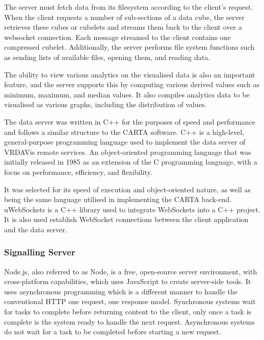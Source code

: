 The server must fetch data from its filesystem according to the client's request. 
When the client requests a number of sub-sections of a data cube, the server retrieves these cubes or cubelets and streams them back to the client over a websocket connection. 
Each message streamed to the client contains one compressed cubelet. 
Additionally, the server performs file system functions such as sending lists of available files, opening them, and reading data.

The ability to view various analytics on the visualised data is also an important feature, and the server supports this by computing various derived values such as minimum, maximum, and median values. 
It also compiles analytics data to be visualised as various graphs, including the distribution of values.

The data server was written in C++ for the purposes of speed and performance and follows a similar structure to the CARTA software.
C++ is a high-level, general-purpose programming language used to implement the data server of VRDAVis remote services. 
An object-oriented programming language that was initially released in 1985 as an extension of the C programming language, with a focus on performance, efficiency, and flexibility.

It was selected for its speed of execution and object-oriented nature, as well as being the same language utilised in implementing the CARTA back-end.
uWebSockets is a C++ library used to integrate WebSockets into a C++ project.
It is also used establish WebSocket connections between the client application and the data server.

\subsubsection{Signalling Server}
Node.js, also referred to as Node, is a free, open-source server environment, with cross-platform capabilities, which uses JavaScript to create server-side tools.
It uses asynchronous programming which is a different manner to handle the conventional HTTP one request, one response model.
Synchronous systems wait for tasks to complete before returning content to the client, only once a task is complete is the system ready to handle the next request.
Asynchronous systems do not wait for a task to be completed before starting a new request.

